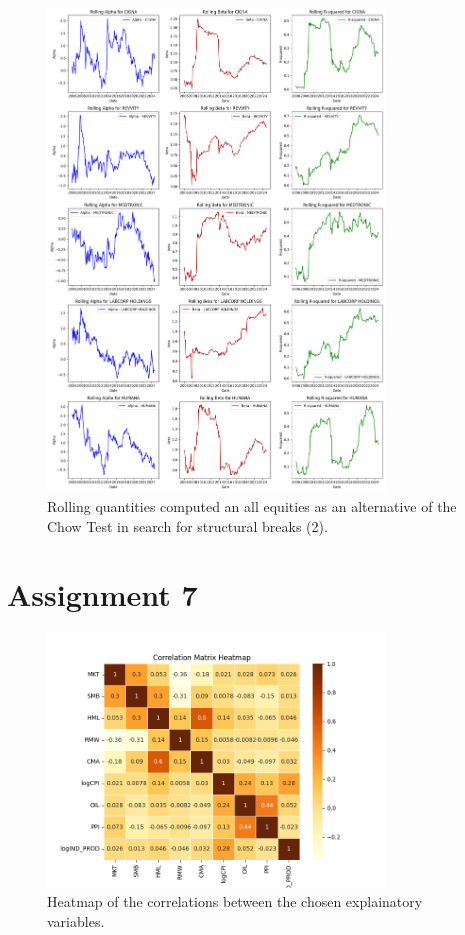 \documentclass[12pt, openright, twoside]{report}
\begin{document}
\begin{figure}[h]
    \centering
    \includegraphics[width=0.8\textwidth]{images/rolling_quantities_2.png}
    \caption{Rolling quantities computed an all equities as an alternative of the Chow Test in search for structural
    breaks (2).}\label{fig:rolling_quantities_2}
\end{figure}

\section*{Assignment 7}

\begin{figure}[h]
    \centering
    \includegraphics[width=0.8\textwidth]{images/Correlation_heatmap.png}
    \caption{Heatmap of the correlations between the chosen explainatory variables.}\label{fig:Correlation_heatmap}
\end{figure}
\end{document}
